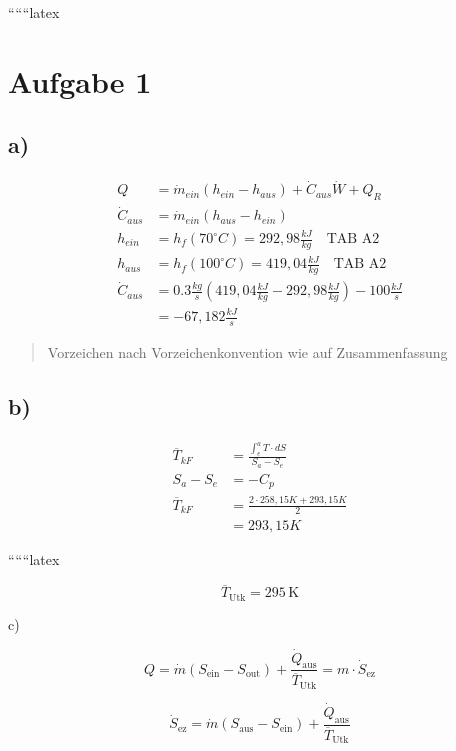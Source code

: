 
``````latex


\section*{Aufgabe 1}

\subsection*{a)}

\begin{align*}
Q &= \dot{m}_{ein} (h_{ein} - h_{aus}) + \dot{C}_{aus} \dot{W} + Q_R \\
\dot{C}_{aus} &= \dot{m}_{ein} (h_{aus} - h_{ein}) \\
h_{ein} &= h_f (70^\circ C) = 292,98 \frac{kJ}{kg} \quad \text{TAB A2} \\
h_{aus} &= h_f (100^\circ C) = 419,04 \frac{kJ}{kg} \quad \text{TAB A2} \\
\dot{C}_{aus} &= 0.3 \frac{kg}{s} (419,04 \frac{kJ}{kg} - 292,98 \frac{kJ}{kg}) - 100 \frac{kJ}{s} \\
&= -67,182 \frac{kJ}{s}
\end{align*}

\begin{quote}
Vorzeichen nach Vorzeichenkonvention wie auf Zusammenfassung
\end{quote}

\subsection*{b)}

\begin{align*}
\overline{T}_{kF} &= \frac{\int_{e}^{a} T \cdot dS}{S_a - S_e} \\
S_a - S_e &= -C_p \\
\overline{T}_{kF} &= \frac{2 \cdot 258,15 K + 293,15 K}{2} \\
&= 293,15 K
\end{align*}

``````latex

\[
\overline{T}_{\text{Utk}} = 295 \, \text{K}
\]

c)

\[
Q = \dot{m} \left( S_{\text{ein}} - S_{\text{out}} \right) + \frac{\dot{Q}_{\text{aus}}}{\overline{T}_{\text{Utk}}} = m \cdot \dot{S}_{\text{ez}}
\]

\[
\dot{S}_{\text{ez}} = \dot{m} \left( S_{\text{aus}} - S_{\text{ein}} \right) + \frac{\dot{Q}_{\text{aus}}}{\overline{T}_{\text{Utk}}}
\]

